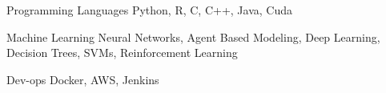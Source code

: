 

\begin{cvskills}


  \cvskill
    {Programming Languages} %
    {Python, R, C, C++, Java, Cuda}

  \cvskill
  {Machine Learning}
  {Neural Networks, Agent Based Modeling, Deep Learning, Decision Trees, SVMs, Reinforcement Learning}

  \cvskill
    {Dev-ops} %
    {Docker, AWS, Jenkins} %

\end{cvskills}
